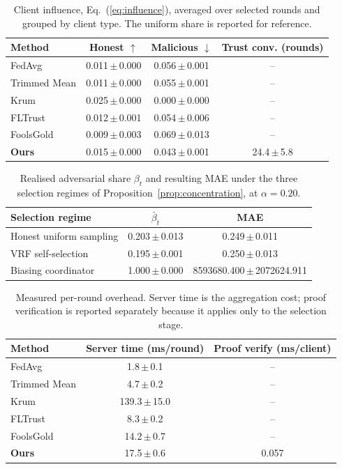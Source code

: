 \begin{table}[t]
\centering
\scriptsize
\caption{Client influence, Eq.~(\ref{eq:influence}), averaged over selected rounds and grouped by client type. The uniform share is reported for reference.}
\label{tab:trust_influence}
\setlength{\tabcolsep}{6pt}
\begin{tabular}{lccc}
\toprule
\textbf{Method} & \textbf{Honest $\uparrow$} & \textbf{Malicious $\downarrow$} & \textbf{Trust conv. (rounds)} \\
\midrule
FedAvg & 0.011\,$\pm$\,0.000 & 0.056\,$\pm$\,0.001 & -- \\
Trimmed Mean & 0.011\,$\pm$\,0.000 & 0.055\,$\pm$\,0.001 & -- \\
Krum & 0.025\,$\pm$\,0.000 & 0.000\,$\pm$\,0.000 & -- \\
FLTrust & 0.012\,$\pm$\,0.001 & 0.054\,$\pm$\,0.006 & -- \\
FoolsGold & 0.009\,$\pm$\,0.003 & 0.069\,$\pm$\,0.013 & -- \\
\textbf{Ours} & 0.015\,$\pm$\,0.000 & 0.043\,$\pm$\,0.001 & 24.4\,$\pm$\,5.8 \\
\bottomrule
\end{tabular}
\end{table}

\begin{table}[t]
\centering
\scriptsize
\caption{Realised adversarial share $\beta_t$ and resulting MAE under the three selection regimes of Proposition~\ref{prop:concentration}, at $\alpha=0.20$.}
\label{tab:selection}
\begin{tabular}{lcc}
\toprule
\textbf{Selection regime} & $\bar{\beta}_t$ & \textbf{MAE} \\
\midrule
Honest uniform sampling & 0.203\,$\pm$\,0.013 & 0.249\,$\pm$\,0.011 \\
VRF self-selection & 0.195\,$\pm$\,0.001 & 0.250\,$\pm$\,0.013 \\
Biasing coordinator & 1.000\,$\pm$\,0.000 & 8593680.400\,$\pm$\,2072624.911 \\
\bottomrule
\end{tabular}
\end{table}

\begin{table}[t]
\centering
\scriptsize
\caption{Measured per-round overhead. Server time is the aggregation cost; proof verification is reported separately because it applies only to the selection stage.}
\label{tab:overhead}
\setlength{\tabcolsep}{4pt}
\begin{tabular}{lcc}
\toprule
\textbf{Method} & \textbf{Server time (ms/round)} & \textbf{Proof verify (ms/client)} \\
\midrule
FedAvg & 1.8\,$\pm$\,0.1 & -- \\
Trimmed Mean & 4.7\,$\pm$\,0.2 & -- \\
Krum & 139.3\,$\pm$\,15.0 & -- \\
FLTrust & 8.3\,$\pm$\,0.2 & -- \\
FoolsGold & 14.2\,$\pm$\,0.7 & -- \\
\textbf{Ours} & 17.5\,$\pm$\,0.6 & 0.057 \\
\bottomrule
\end{tabular}
\end{table}

